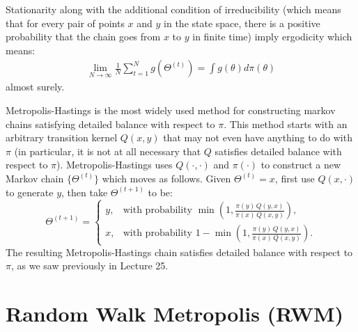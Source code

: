 \documentclass{scrartcl}
\begin{document}
Stationarity along with the additional condition of irreducibility
(which means that for every pair of points $x$ and $y$ in the state
space, there is a positive probability that the chain goes from $x$ to
$y$ in finite time) imply ergodicity which means:
\begin{align*}
  \lim_{N \rightarrow \infty} \frac{1}{N} \sum_{t=1}^N g(\Theta^{(t)})
  = \int g(\theta) d\pi(\theta)
\end{align*}
almost surely.

Metropolis-Hastings is the most widely used method for constructing
markov chains satisfying detailed balance with respect to $\pi$. This
method starts with an arbitrary transition kernel $Q(x, y)$ that may
not even have anything to do with $\pi$ (in particular, it is not at
all necessary that $Q$ satisfies detailed balance with respect to
$\pi$). Metropolis-Hastings uses $Q(\cdot, \cdot)$ and $\pi(\cdot)$ to
  construct a new Markov chain $\{\Theta^{(t)}\}$ which moves as
  follows. Given $\Theta^{(t)} = x$, first use $Q(x, \cdot)$ to
  generate $y$, then take $\Theta^{(t+1)}$ to be:
  \[
\Theta^{(t+1)} =
\begin{cases}
y, & \text{with probability } \min\!\left(1, \frac{\pi(y)\,Q(y,x)}{\pi(x)\,Q(x,y)}\right), \\[1em]
x, & \text{with probability } 1 - \min\!\left(1, \frac{\pi(y)\,Q(y,x)}{\pi(x)\,Q(x,y)}\right).
\end{cases}
\]
The resulting Metropolis-Hastings chain  satisfies detailed
balance with respect to $\pi$, as we saw previously in Lecture 25.

\section{Random Walk Metropolis (RWM)}
\end{document}
